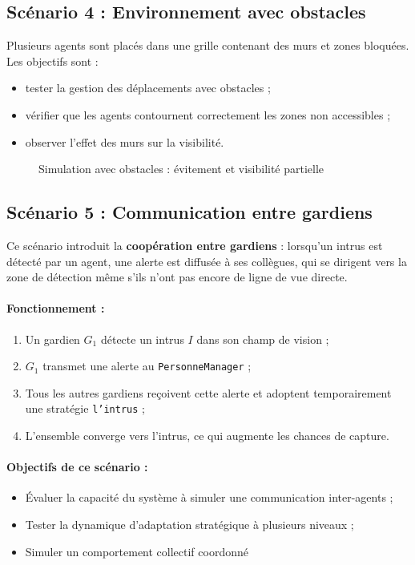 \subsection{Scénario 4 : Environnement avec obstacles}
Plusieurs agents sont placés dans une grille contenant des murs et zones bloquées. Les objectifs sont :
\begin{itemize}
    \item tester la gestion des déplacements avec obstacles ;
    \item vérifier que les agents contournent correctement les zones non accessibles ;
    \item observer l’effet des murs sur la visibilité.
\end{itemize}

\begin{figure}[H]
    \centering
   
    \caption{Simulation avec obstacles : évitement et visibilité partielle}
\end{figure}

\subsection{Scénario 5 : Communication entre gardiens}
Ce scénario introduit la \textbf{coopération entre gardiens} : lorsqu’un intrus est détecté par un agent, une alerte est diffusée à ses collègues, qui se dirigent vers la zone de détection même s’ils n’ont pas encore de ligne de vue directe.

\paragraph{Fonctionnement :}
\begin{enumerate}
    \item Un gardien $G_1$ détecte un intrus $I$ dans son champ de vision ;
    \item $G_1$ transmet une alerte  au \texttt{PersonneManager} ;
    \item Tous les autres gardiens reçoivent cette alerte et adoptent temporairement une stratégie \texttt{l'intrus} ;
    \item L’ensemble converge vers l’intrus, ce qui augmente les chances de capture.
\end{enumerate}

\paragraph{Objectifs de ce scénario :}
\begin{itemize}
    \item Évaluer la capacité du système à simuler une communication inter-agents ;
    \item Tester la dynamique d’adaptation stratégique à plusieurs niveaux ;
    \item Simuler un comportement collectif coordonné
\end{itemize}


